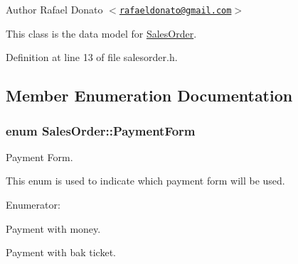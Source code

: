 \begin{DoxyAuthor}{\-Author}
\-Rafael \-Donato $<$\href{mailto:rafaeldonato@gmail.com}{\tt rafaeldonato@gmail.\-com}$>$
\end{DoxyAuthor}
\-This class is the data model for \hyperlink{class_sales_order}{\-Sales\-Order}. 

\-Definition at line 13 of file salesorder.\-h.



\subsection{\-Member \-Enumeration \-Documentation}
\hypertarget{class_sales_order_aea62d62de9cfe64f734061c664156744}{
\subsubsection[{\-Payment\-Form}]{\setlength{\rightskip}{0pt plus 5cm}enum {\bf \-Sales\-Order\-::\-Payment\-Form}}}\label{class_sales_order_aea62d62de9cfe64f734061c664156744}


\-Payment \-Form. 

\-This enum is used to indicate which payment form will be used. \begin{Desc}
\item[\-Enumerator\-: ]\par
\begin{description}
\item[{\em 
\hypertarget{class_sales_order_aea62d62de9cfe64f734061c664156744abfe58e9329c6f3ff37cb0df5db2a2c54}{\-C\-A\-C\-H\-E}\label{class_sales_order_aea62d62de9cfe64f734061c664156744abfe58e9329c6f3ff37cb0df5db2a2c54}
}]\-Payment with money. \item[{\em 
\hypertarget{class_sales_order_aea62d62de9cfe64f734061c664156744afd1b7c2de470d776b95150014c6c84c0}{\-B\-A\-N\-K\-\_\-\-T\-I\-C\-K\-E\-T}\label{class_sales_order_aea62d62de9cfe64f734061c664156744afd1b7c2de470d776b95150014c6c84c0}
}]\-Payment with bak ticket. \end{description}
\end{Desc}



